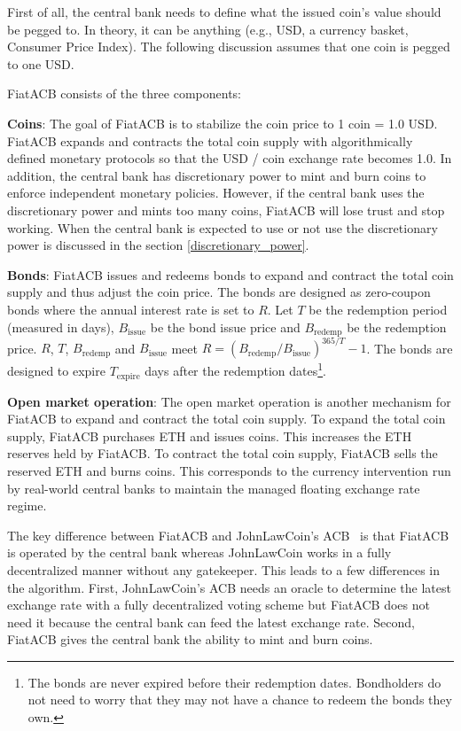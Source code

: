 \documentclass[dvipdfmx,a4paper]{article}
\begin{document}
First of all, the central bank needs to define what the issued coin's value should be pegged to. In theory, it can be anything (e.g., USD, a currency basket, Consumer Price Index). The following discussion assumes that one coin is pegged to one USD.

FiatACB consists of the three components:

\begin{description}
\item{\textbf{Coins}}: The goal of FiatACB is to stabilize the coin price to 1 coin = 1.0 USD. FiatACB expands and contracts the total coin supply with algorithmically defined monetary protocols so that the USD / coin exchange rate becomes 1.0. In addition, the central bank has discretionary power to mint and burn coins to enforce independent monetary policies. However, if the central bank uses the discretionary power and mints too many coins, FiatACB will lose trust and stop working. When the central bank is expected to use or not use the discretionary power is discussed in the section \ref{discretionary_power}.
\item{\textbf{Bonds}}: FiatACB issues and redeems bonds to expand and contract the total coin supply and thus adjust the coin price. The bonds are designed as zero-coupon bonds where the annual interest rate is set to $R$. Let $T$ be the redemption period (measured in days), $B_{\mathrm{issue}}$ be the bond issue price and $B_{\mathrm{redemp}}$ be the redemption price. $R$, $T$, $B_{\mathrm{redemp}}$ and $B_{\mathrm{issue}}$ meet $R=(B_{\mathrm{redemp}}/B_{\mathrm{issue}})^{365/T}-1$. The bonds are designed to expire $T_{\mathrm{expire}}$ days after the redemption dates\footnote{The bonds are never expired before their redemption dates. Bondholders do not need to worry that they may not have a chance to redeem the bonds they own.}.
\item{\textbf{Open market operation}}: The open market operation is another mechanism for FiatACB to expand and contract the total coin supply. To expand the total coin supply, FiatACB purchases ETH and issues coins. This increases the ETH reserves held by FiatACB. To contract the total coin supply, FiatACB sells the reserved ETH and burns coins. This corresponds to the currency intervention run by real-world central banks to maintain the managed floating exchange rate regime.
\end{description}

The key difference between FiatACB and JohnLawCoin's ACB~\cite{johnlawcoin} is that FiatACB is operated by the central bank whereas JohnLawCoin works in a fully decentralized manner without any gatekeeper. This leads to a few differences in the algorithm. First, JohnLawCoin's ACB needs an oracle to determine the latest exchange rate with a fully decentralized voting scheme but FiatACB does not need it because the central bank can feed the latest exchange rate. Second, FiatACB gives the central bank the ability to mint and burn coins.
\end{document}
